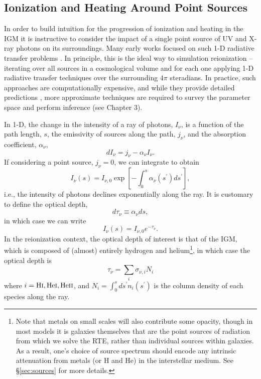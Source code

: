 \subsection{Ionization and Heating Around Point Sources} \label{sec:smallscales}
In order to build intuition for the progression of ionization and heating in the IGM it is instructive to consider the impact of a single point source of UV and X-ray photons on its surroundings. Many early works focused on such 1-D radiative transfer problems \cite{Iliev2006,Thomas2008}. In principle, this is the ideal way to simulation reionization -- iterating over all sources in a cosmological volume and for each one applying 1-D radiative transfer techniques over the surrounding $4\pi$ steradians. In practice, such approaches are computationally expensive, and while they provide detailed predictions \cite{OShea2015,Ocvirk2016,Gnedin2014}, more approximate techniques are required to survey the parameter space and perform inference (see Chapter 3).

In 1-D, the change in the intensity of a ray of photons, $I_{\nu}$, is a function of the path length, $s$, the emissivity of sources along the path, $j_{\nu}$, and the absorption coefficient, $\alpha_{\nu}$, 
\begin{equation}
	dI_{\nu} = j_{\nu} - \alpha_{\nu} I_{\nu} .
\end{equation}
If considering a point source, $j_{\nu} = 0$, we can integrate to obtain
\begin{equation}
	I_{\nu}(s) = I_{\nu,0} \exp\left[-\int_0^s \alpha_{\nu}(s^{\prime}) ds^{\prime} \right] ,
\end{equation}
i.e., the intensity of photons declines exponentially along the ray. It is customary to define the optical depth, 
\begin{equation}
	d\tau_{\nu} \equiv \alpha_{\nu} ds ,
\end{equation}
in which case we can write
\begin{equation}
	I_{\nu}(s) = I_{\nu,0} e^{-\tau_{\nu}} .
\end{equation}
In the reionization context, the optical depth of interest is that of the IGM, which is composed of (almost) entirely hydrogen and helium\footnote{Note that metals on small scales will also contribute some opacity, though in most models it is galaxies themselves that are the point sources of radiation from which we solve the RTE, rather than individual sources within galaxies. As a result,  one's choice of source spectrum should encode any intrinsic attenuation from metals (or H and He) in the interstellar medium. See \S\ref{sec:sources} for more details.}, in which case the optical depth is 
\begin{equation}
	\tau_{\nu} = \sum_i \sigma_{\nu,i} N_i
\end{equation}
where $i=\text{H} {\textsc{i}},\text{He} {\textsc{i}},\text{He} {\textsc{ii}}$, and $N_i = \int_0^s ds^{\prime} n_i(s^{\prime})$ is the column density of each species along the ray.

